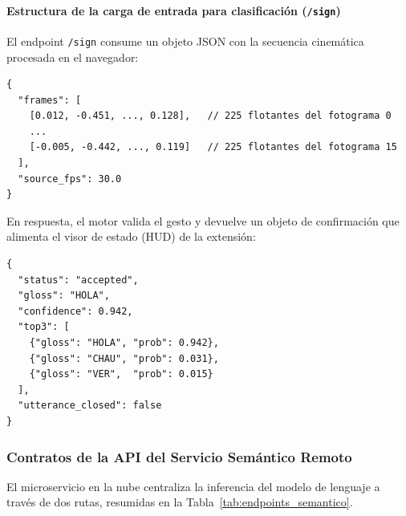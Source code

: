 \paragraph{Estructura de la carga de entrada para clasificación (\texttt{/sign})}
El endpoint \texttt{/sign} consume un objeto JSON con la secuencia cinemática procesada en el navegador:
\begin{verbatim}
{
  "frames": [
    [0.012, -0.451, ..., 0.128],   // 225 flotantes del fotograma 0
    ...
    [-0.005, -0.442, ..., 0.119]   // 225 flotantes del fotograma 15
  ],
  "source_fps": 30.0
}
\end{verbatim}
En respuesta, el motor valida el gesto y devuelve un objeto de confirmación que alimenta el visor de estado (HUD) de la extensión:
\begin{verbatim}
{
  "status": "accepted",
  "gloss": "HOLA",
  "confidence": 0.942,
  "top3": [
    {"gloss": "HOLA", "prob": 0.942},
    {"gloss": "CHAU", "prob": 0.031},
    {"gloss": "VER",  "prob": 0.015}
  ],
  "utterance_closed": false
}
\end{verbatim}

\subsubsection{Contratos de la API del Servicio Semántico Remoto}
El microservicio en la nube centraliza la inferencia del modelo de lenguaje a través de dos rutas, resumidas en la Tabla~\ref{tab:endpoints_semantico}.

